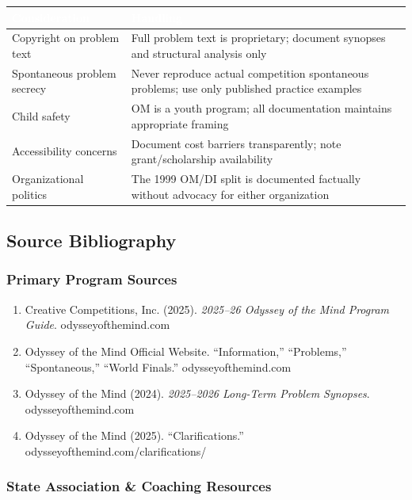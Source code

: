 \documentclass[11pt,letterpaper]{article}
\newcommand{\tableheader}[1]{\textbf{\sffamily\textcolor{white}{#1}}}
\begin{document}
\begin{center}
\begin{tabularx}{\textwidth}{L{4cm}X}
\toprule
{}
\tableheader{Consideration} & \tableheader{Handling} \\
\midrule
Copyright on problem text & Full problem text is proprietary; document synopses and structural analysis only \\
Spontaneous problem secrecy & Never reproduce actual competition spontaneous problems; use only published practice examples \\
Child safety & OM is a youth program; all documentation maintains appropriate framing \\
Accessibility concerns & Document cost barriers transparently; note grant/scholarship availability \\
Organizational politics & The 1999 OM/DI split is documented factually without advocacy for either organization \\
\bottomrule
\end{tabularx}
\end{center}

\subsection{Source Bibliography}

\subsubsection{Primary Program Sources}

\begin{enumerate}[leftmargin=2em]
\item Creative Competitions, Inc. (2025). \emph{2025--26 Odyssey of the Mind Program Guide}. odysseyofthemind.com
\item Odyssey of the Mind Official Website. ``Information,'' ``Problems,'' ``Spontaneous,'' ``World Finals.'' odysseyofthemind.com
\item Odyssey of the Mind (2024). \emph{2025--2026 Long-Term Problem Synopses}. odysseyofthemind.com
\item Odyssey of the Mind (2025). ``Clarifications.'' odysseyofthemind.com/clarifications/
\end{enumerate}

\subsubsection{State Association \& Coaching Resources}
\end{document}
